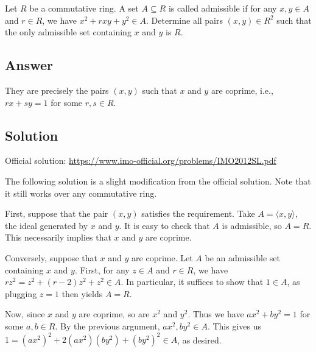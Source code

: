 Let $R$ be a commutative ring.
A set $A \subseteq R$ is called admissible if for any $x, y \in A$ and $r \in R$, we have $x^2 + rxy + y^2 \in A$.
Determine all pairs $(x, y) \in R^2$ such that the only admissible set containing $x$ and $y$ is $R$.



\subsection*{Answer}

They are precisely the pairs $(x, y)$ such that $x$ and $y$ are coprime, i.e., $rx + sy = 1$ for some $r, s \in R$.



\subsection*{Solution}

Official solution: \url{https://www.imo-official.org/problems/IMO2012SL.pdf}

The following solution is a slight modification from the official solution.
Note that it still works over any commutative ring.

First, suppose that the pair $(x, y)$ satisfies the requirement.
Take $A = \langle x, y \rangle$, the ideal generated by $x$ and $y$.
It is easy to check that $A$ is admissible, so $A = R$.
This necessarily implies that $x$ and $y$ are coprime.

Conversely, suppose that $x$ and $y$ are coprime.
Let $A$ be an admissible set containing $x$ and $y$.
First, for any $z \in A$ and $r \in R$, we have $rz^2 = z^2 + (r - 2) z^2 + z^2 \in A$.
In particular, it suffices to show that $1 \in A$, as plugging $z = 1$ then yields $A = R$.

Now, since $x$ and $y$ are coprime, so are $x^2$ and $y^2$.
Thus we have $ax^2 + by^2 = 1$ for some $a, b \in R$.
By the previous argument, $ax^2, by^2 \in A$.
This gives us $1 = (ax^2)^2 + 2(ax^2)(by^2) + (by^2)^2 \in A$, as desired.
